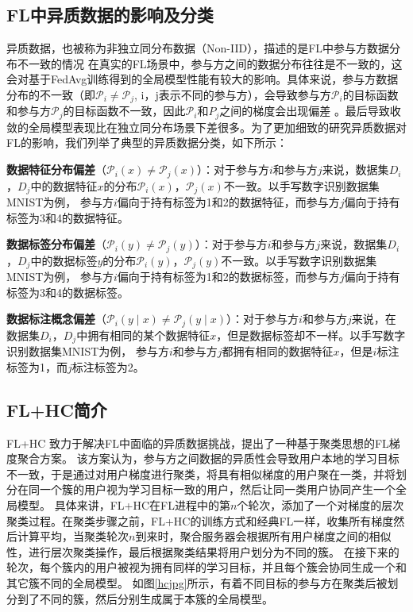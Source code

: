 \subsection{FL中异质数据的影响及分类}
异质数据，也被称为非独立同分布数据（Non-IID），描述的是FL中参与方数据分布不一致的情况
在真实的FL场景中，参与方之间的数据分布往往是不一致的，这会对基于FedAvg训练得到的全局模型性能有较大的影响。具体来说，参与方数据分布的不一致（即$\mathcal{P}_i \neq \mathcal{P}_j$, i，j表示不同的参与方），会导致参与方$\mathcal{P}_i$的目标函数和参与方$\mathcal{P}_j$的目标函数不一致，因此$\mathcal{P}_i$和$P_j$之间的梯度会出现偏差 \cite{kaissis2020secure}。最后导致收敛的全局模型表现比在独立同分布场景下差很多。为了更加细致的研究异质数据对FL的影响，我们列举了典型的异质数据分类，如下所示：
\begin{compactitem}
    \item \textbf{数据特征分布偏差}（$\mathcal{P}_i(x) \neq \mathcal{P}_j(x)$）：对于参与方$i$和参与方$j$来说，数据集$D_i$，$D_j$中的数据特征$x$的分布$\mathcal{P}_i(x)$，$\mathcal{P}_j(x)$不一致。以手写数字识别数据集MNIST为例， 参与方$i$偏向于持有标签为1和2的数据特征，而参与方$j$偏向于持有标签为3和4的数据特征。
    \item \textbf{数据标签分布偏差}（$\mathcal{P}_i(y) \neq \mathcal{P}_j(y)$）：对于参与方$i$和参与方$j$来说，数据集$D_i$，$D_j$中的数据标签$y$的分布$\mathcal{P}_i(y)$，$\mathcal{P}_j(y)$不一致。以手写数字识别数据集MNIST为例， 参与方$i$偏向于持有标签为1和2的数据标签，而参与方$j$偏向于持有标签为3和4的数据标签。
    \item \textbf{数据标注概念偏差}（$\mathcal{P}_i(y \mid x) \neq\mathcal{P}_j(y \mid x)$）：对于参与方$i$和参与方$j$来说，在数据集$D_i$，$D_j$中拥有相同的某个数据特征$x$，但是数据标签却不一样。以手写数字识别数据集MNIST为例， 参与方$i$和参与方$j$都拥有相同的数据特征$x$，但是$i$标注标签为1，而$j$标注标签为2。
\end{compactitem}

\subsection{FL+HC简介}
FL+HC \cite{briggs2020federated} 致力于解决FL中面临的异质数据挑战，提出了一种基于聚类思想的FL梯度聚合方案。
该方案认为，参与方之间数据的异质性会导致用户本地的学习目标不一致，于是通过对用户梯度进行聚类，将具有相似梯度的用户聚在一类，并将划分在同一个簇的用户视为学习目标一致的用户，然后让同一类用户协同产生一个全局模型。
具体来讲，FL+HC在FL进程中的第$n$个轮次，添加了一个对梯度的层次聚类过程。在聚类步骤之前，FL+HC的训练方式和经典FL一样，收集所有梯度然后计算平均，当聚类轮次$n$到来时，聚合服务器会根据所有用户梯度之间的相似性，进行层次聚类操作，最后根据聚类结果将用户划分为不同的簇。
在接下来的轮次，每个簇内的用户被视为拥有同样的学习目标，并且每个簇会协同生成一个和其它簇不同的全局模型。
如图\ref{hcjpg}所示，有着不同目标的参与方在聚类后被划分到了不同的簇，然后分别生成属于本簇的全局模型。

